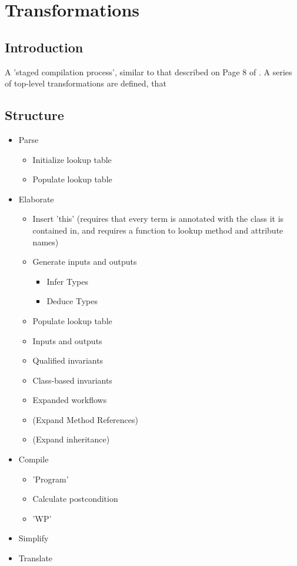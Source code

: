\chapter{Transformations}

\section{Introduction}

A 'staged compilation process', similar to that described on Page 8 of \cite{KatsVisser2010}.
A series of top-level transformations are defined, that  


\section{Structure}

\begin{itemize}
  \item Parse
  \begin{itemize}
    \item Initialize lookup table
    \item Populate lookup table
  \end{itemize}
  \item Elaborate
  \begin{itemize}
    \item Insert 'this'
     (requires that every term is annotated with the class it is contained in, 
      and requires a function to lookup method and attribute names) 
    \item Generate inputs and outputs
    \begin{itemize}
      \item Infer Types
      \item Deduce Types
    \end{itemize}
    \item Populate lookup table
    \item Inputs and outputs
    \item Qualified invariants
    \item Class-based invariants
    \item Expanded workflows
    \item (Expand Method References)
    \item (Expand inheritance)
  \end{itemize}    
  \item Compile
  \begin{itemize}
    \item 'Program'
    \item Calculate postcondition
    \item 'WP'
  \end{itemize}
  \item Simplify
  \item Translate
\end{itemize}


